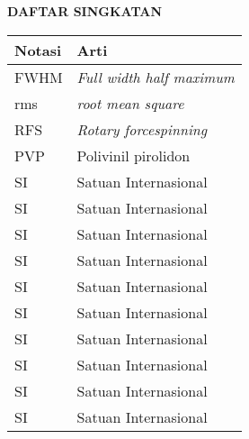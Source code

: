 \clearpage
{}
{}

\begin{center}
    \large \textbf{DAFTAR SINGKATAN}
\end{center}
\vspace{3em}

\begin{center}
    \begin{table}[hb]
        \begin{tabular}{|l|l|}
        \hline
        \textbf{Notasi} & \textbf{Arti}                    \\ \hline
        FWHM            & \textit{Full width half maximum} \\ \hline
        rms             & \textit{root mean square}        \\ \hline
        RFS             & \textit{Rotary forcespinning}    \\ \hline
        PVP             & Polivinil pirolidon              \\ \hline
        SI              & Satuan Internasional             \\ \hline
        SI              & Satuan Internasional             \\ \hline
        SI              & Satuan Internasional             \\ \hline
        SI              & Satuan Internasional             \\ \hline
        SI              & Satuan Internasional             \\ \hline
        SI              & Satuan Internasional             \\ \hline
        SI              & Satuan Internasional             \\ \hline
        SI              & Satuan Internasional             \\ \hline
        SI              & Satuan Internasional             \\ \hline
        SI              & Satuan Internasional             \\ \hline
        \end{tabular}
        \end{table}
\end{center}
